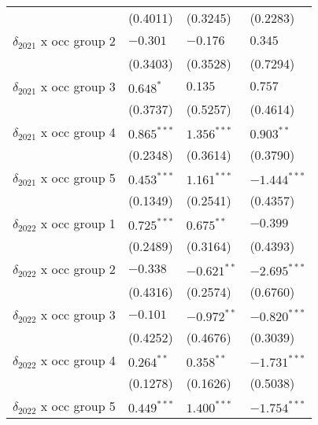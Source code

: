 \begin{tabular}{llll}
                                         &           (0.4011) &           (0.3245) &           (0.2283) \\
$\delta_{2021}$ x occ group 2            &           $-0.301$ &           $-0.176$ &            $0.345$ \\
                                         &           (0.3403) &           (0.3528) &           (0.7294) \\
$\delta_{2021}$ x occ group 3            &          $0.648^*$ &            $0.135$ &            $0.757$ \\
                                         &           (0.3737) &           (0.5257) &           (0.4614) \\
$\delta_{2021}$ x occ group 4            &      $0.865^{***}$ &      $1.356^{***}$ &       $0.903^{**}$ \\
                                         &           (0.2348) &           (0.3614) &           (0.3790) \\
$\delta_{2021}$ x occ group 5            &      $0.453^{***}$ &      $1.161^{***}$ &     $-1.444^{***}$ \\
                                         &           (0.1349) &           (0.2541) &           (0.4357) \\
$\delta_{2022}$ x occ group 1            &      $0.725^{***}$ &       $0.675^{**}$ &           $-0.399$ \\
                                         &           (0.2489) &           (0.3164) &           (0.4393) \\
$\delta_{2022}$ x occ group 2            &           $-0.338$ &      $-0.621^{**}$ &     $-2.695^{***}$ \\
                                         &           (0.4316) &           (0.2574) &           (0.6760) \\
$\delta_{2022}$ x occ group 3            &           $-0.101$ &      $-0.972^{**}$ &     $-0.820^{***}$ \\
                                         &           (0.4252) &           (0.4676) &           (0.3039) \\
$\delta_{2022}$ x occ group 4            &       $0.264^{**}$ &       $0.358^{**}$ &     $-1.731^{***}$ \\
                                         &           (0.1278) &           (0.1626) &           (0.5038) \\
$\delta_{2022}$ x occ group 5            &      $0.449^{***}$ &      $1.400^{***}$ &     $-1.754^{***}$ \\

\end{tabular}
